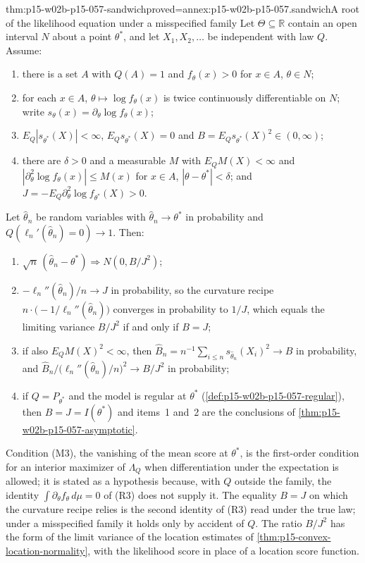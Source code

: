 \begin{hbtheorem}{thm:p15-w02b-p15-057-sandwich}{proved=annex:p15-w02b-p15-057.sandwich}{A root of the likelihood equation under a misspecified family}
Let \(\Theta\subseteq\mathbb R\) contain an open interval \(N\) about a
point \(\theta^*\), and let \(X_1,X_2,\ldots\) be independent with law
\(Q\). Assume:
\begin{enumerate}
\item[(M1)] there is a set \(A\) with \(Q(A)=1\) and \(f_\theta(x)>0\) for
 \(x\in A\), \(\theta\in N\);
\item[(M2)] for each \(x\in A\), \(\theta\mapsto\log f_\theta(x)\) is twice
 continuously differentiable on \(N\); write
 \(s_\theta(x)=\partial_\theta\log f_\theta(x)\);
\item[(M3)] \(E_Q|s_{\theta^*}(X)|<\infty\), \(E_Qs_{\theta^*}(X)=0\) and
 \(B=E_Qs_{\theta^*}(X)^2\in(0,\infty)\);
\item[(M4)] there are \(\delta>0\) and a measurable \(M\) with
 \(E_QM(X)<\infty\) and
 \(|\partial_\theta^2\log f_\theta(x)|\leq M(x)\) for \(x\in A\),
 \(|\theta-\theta^*|<\delta\); and
 \(J=-E_Q\partial_\theta^2\log f_{\theta^*}(X)>0\).
\end{enumerate}
Let \(\widehat\theta_n\) be random variables with
\(\widehat\theta_n\to\theta^*\) in probability and
\(Q(\ell_n'(\widehat\theta_n)=0)\to1\). Then:
\begin{enumerate}
\item \(\sqrt n\,(\widehat\theta_n-\theta^*)\Rightarrow N(0,B/J^2)\);
\item \(-\ell_n''(\widehat\theta_n)/n\to J\) in probability, so the
 curvature recipe \(n\cdot\bigl(-1/\ell_n''(\widehat\theta_n)\bigr)\)
 converges in probability to \(1/J\), which equals the limiting variance
 \(B/J^2\) if and only if \(B=J\);
\item if also \(E_QM(X)^2<\infty\), then
 \(\widehat B_n=n^{-1}\sum_{i\leq n}s_{\widehat\theta_n}(X_i)^2\to B\) in
 probability, and
 \(\widehat B_n\big/\bigl(\ell_n''(\widehat\theta_n)/n\bigr)^2\to B/J^2\)
 in probability;
\item if \(Q=P_{\theta^*}\) and the model is regular at \(\theta^*\)
 (\cref{def:p15-w02b-p15-057-regular}), then \(B=J=I(\theta^*)\) and
 items~1 and~2 are the conclusions of
 \cref{thm:p15-w02b-p15-057-asymptotic}.
\end{enumerate}
\end{hbtheorem}

Condition (M3), the vanishing of the mean score at \(\theta^*\), is the
first-order condition for an interior maximizer of \(\Lambda_Q\) when
differentiation under the expectation is allowed; it is stated as a
hypothesis because, with \(Q\) outside the family, the identity
\(\int\partial_\theta f_\theta\,d\mu=0\) of (R3) does not supply it. The
equality \(B=J\) on which the curvature recipe relies is the second
identity of (R3) read under the true law; under a misspecified family it
holds only by accident of \(Q\). The ratio \(B/J^2\) has the form of the
limit variance of the location estimates of
\cref{thm:p15-convex-location-normality}, with the likelihood score in
place of a location score function.

